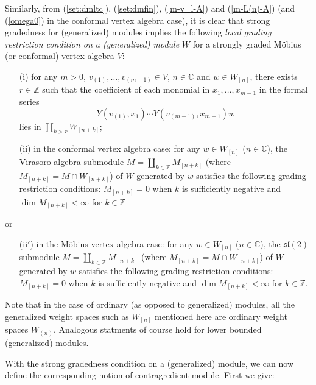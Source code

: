 \documentclass[12pt]{article}
\begin{document}
\begin{rema}{\rm
Similarly, {}from (\ref{set:dmltc}), (\ref{set:dmfin}),
(\ref{m-v_l-A}) and (\ref{m-L(n)-A}) (and (\ref{omega0}) in the
conformal vertex algebra case), it is clear that strong gradedness for
(generalized) modules implies the following {\it local grading
restriction condition on a (generalized) module} $W$ for a strongly
graded M\"obius (or conformal) vertex algebra $V$:
\begin{enumerate}
\item[(i)] for any $m>0$, $v_{(1)}, \dots, v_{(m-1)}\in V$, $n\in{\mathbb
C}$ and $w\in W_{[n]}$, there exists $r\in {\mathbb Z}$ such that the
coefficient of each monomial in $x_1, \dots, x_{m-1}$ in the formal
series
\[
Y(v_{(1)}, x_1)\cdots Y(v_{(m-1)}, x_{m-1})w
\]
lies in $\coprod_{k>r}W_{[n+k]}$;
\item[(ii)] in the conformal vertex algebra case: for any $w\in
W_{[n]}$ ($n\in{\mathbb C}$), the Virasoro-algebra submodule
$M=\coprod_{k\in {\mathbb Z}}M_{[n+k]}$ (where $M_{[n+k]}=M\cap
W_{[n+k]}$) of $W$ generated by $w$ satisfies the following grading
restriction conditions: $M_{[n+k]}=0$ when $k$ is sufficiently
negative and $\dim M_{[n+k]}<\infty$ for $k\in {\mathbb Z}$
\end{enumerate}
or
\begin{enumerate}
\item[(ii$'$)] in the M\"obius vertex algebra case: for any $w\in
W_{[n]}$ ($n\in {\mathbb C}$), the ${\mathfrak s}{\mathfrak l}(2)$-submodule
$M=\coprod_{k\in {\mathbb Z}}M_{[n+k]}$ (where $M_{[n+k]}=M\cap
W_{[n+k]}$) of $W$ generated by $w$ satisfies the following grading
restriction conditions: $M_{[n+k]}=0$ when $k$ is sufficiently
negative and $\dim M_{[n+k]}<\infty$ for $k\in {\mathbb Z}$.
\end{enumerate}
Note that in the case of ordinary (as opposed to generalized) modules,
all the generalized weight spaces such as $W_{[n]}$ mentioned here are
ordinary weight spaces $W_{(n)}$.  Analogous statments of course hold
for lower bounded (generalized) modules.}
\end{rema}

With the strong gradedness condition on a (generalized) module, we can
now define the corresponding notion of contragredient module. First we
give:
\end{document}
